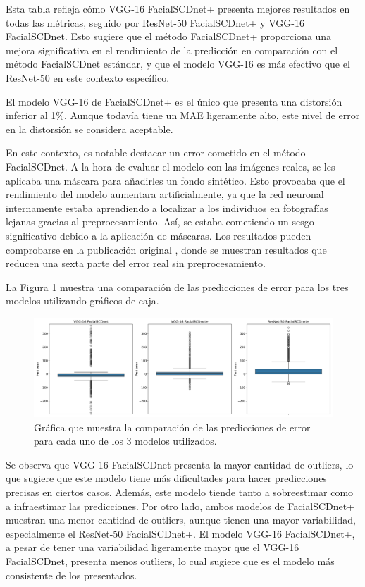 Esta tabla refleja cómo VGG-16 FacialSCDnet+ presenta mejores resultados en todas las métricas, seguido por ResNet-50 FacialSCDnet+ y VGG-16 FacialSCDnet. Esto sugiere que el método FacialSCDnet+ proporciona una mejora significativa en el rendimiento de la predicción en comparación con el método FacialSCDnet estándar, y que el modelo VGG-16 es más efectivo que el ResNet-50 en este contexto específico.

El modelo VGG-16 de FacialSCDnet+ es el único que presenta una distorsión inferior al 1\%. Aunque todavía tiene un MAE ligeramente alto, este nivel de error en la distorsión se considera aceptable.

En este contexto, es notable destacar un error cometido en el método FacialSCDnet. A la hora de evaluar el modelo con las imágenes reales, se les aplicaba una máscara para añadirles un fondo sintético. Esto provocaba que el rendimiento del modelo aumentara artificialmente, ya que la red neuronal internamente estaba aprendiendo a localizar a los individuos en fotografías lejanas gracias al preprocesamiento. Así, se estaba cometiendo un sesgo significativo debido a la aplicación de  máscaras. Los resultados pueden comprobarse en la publicación original \cite{14}, donde se muestran resultados que reducen una sexta parte del error real sin preprocesamiento.

La Figura \ref{fig35} muestra una comparación de las predicciones de error para los tres modelos utilizando gráficos de caja.

\begin{figure}[h]
	\centering
	\includegraphics[width=\textwidth]{imagenes/cap5/boxplot_real.png}
	\caption[Comparación predicciones de error test real.]{Gráfica que muestra la comparación de las predicciones de error para cada uno de los 3 modelos utilizados.}
	\label{fig35}
\end{figure}

Se observa que VGG-16 FacialSCDnet presenta la mayor cantidad de outliers, lo que sugiere que este modelo tiene más dificultades para hacer predicciones precisas en ciertos casos. Además, este modelo tiende tanto a sobreestimar como a infraestimar las predicciones. Por otro lado, ambos modelos de FacialSCDnet+ muestran una menor cantidad de outliers, aunque tienen una mayor variabilidad, especialmente el ResNet-50 FacialSCDnet+. El modelo VGG-16 FacialSCDnet+, a pesar de tener una variabilidad ligeramente mayor que el VGG-16 FacialSCDnet, presenta menos outliers, lo cual sugiere que es el modelo más consistente de los presentados.

